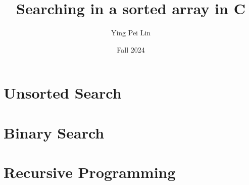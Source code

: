 \documentclass[a4paper,11pt]{article}
\begin{document}
\title{
  \textbf{Searching in a sorted array in C}
}
\author{Ying Pei Lin}
\date{Fall 2024}

\maketitle

\section*{Unsorted Search}

\section*{Binary Search}

\section*{Recursive Programming}
\end{document}
